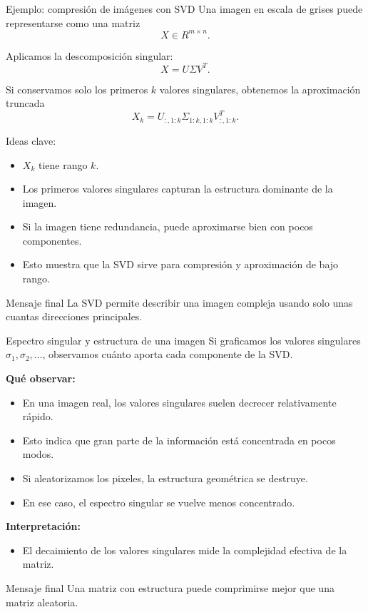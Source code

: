 \begin{frame}{Ejemplo: compresión de imágenes con SVD}
\small
Una imagen en escala de grises puede representarse como una matriz
\[
X \in R^{m \times n}.
\]

Aplicamos la descomposición singular:
\[
X = U \Sigma V^T.
\]

Si conservamos solo los primeros $k$ valores singulares, obtenemos la aproximación truncada
\[
X_k = U_{:,1:k} \Sigma_{1:k,1:k} V_{:,1:k}^T.
\]

Ideas clave:
\begin{itemize}\footnotesize
  \item $X_k$ tiene rango $k$.
  \item Los primeros valores singulares capturan la estructura dominante de la imagen.
  \item Si la imagen tiene redundancia, puede aproximarse bien con pocos componentes.
  \item Esto muestra que la SVD sirve para compresión y aproximación de bajo rango.
\end{itemize}
\vspace{-0.15em}
\begin{block}{Mensaje final}
\centering
La SVD permite describir una imagen compleja usando solo unas cuantas direcciones principales.
\end{block}
\end{frame}

\begin{frame}{Espectro singular y estructura de una imagen}
\small
Si graficamos los valores singulares $\sigma_1, \sigma_2, \dots$, observamos cuánto aporta cada componente de la SVD.

\vspace{0.2em}
\textbf{Qué observar:}
\begin{itemize}\footnotesize
  \item En una imagen real, los valores singulares suelen decrecer relativamente rápido.
  \item Esto indica que gran parte de la información está concentrada en pocos modos.
  \item Si aleatorizamos los pixeles, la estructura geométrica se destruye.
  \item En ese caso, el espectro singular se vuelve menos concentrado.
\end{itemize}

\textbf{Interpretación:}
\begin{itemize}\footnotesize
  \item El decaimiento de los valores singulares mide la complejidad efectiva de la matriz.
\end{itemize}

\begin{block}{Mensaje final}
\centering
Una matriz con estructura puede comprimirse mejor que una matriz aleatoria.
\end{block}
\end{frame}

